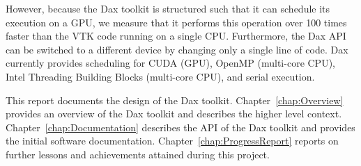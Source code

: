 However, because the Dax toolkit is structured such that it can schedule
its execution on a GPU, we measure that it performs this operation over 100
times faster than the VTK code running on a single CPU. Furthermore, the
Dax API can be switched to a different device by changing only a single
line of code. Dax currently provides scheduling for CUDA (GPU), OpenMP
(multi-core CPU), Intel Threading Building Blocks (multi-core CPU), and
serial execution.

This report documents the design of the Dax
toolkit. Chapter~\ref{chap:Overview} provides an overview of the Dax
toolkit and describes the higher level
context. Chapter~\ref{chap:Documentation} describes the API of the Dax
toolkit and provides the initial software
documentation. Chapter~\ref{chap:ProgressReport} reports on further lessons
and achievements attained during this project.
